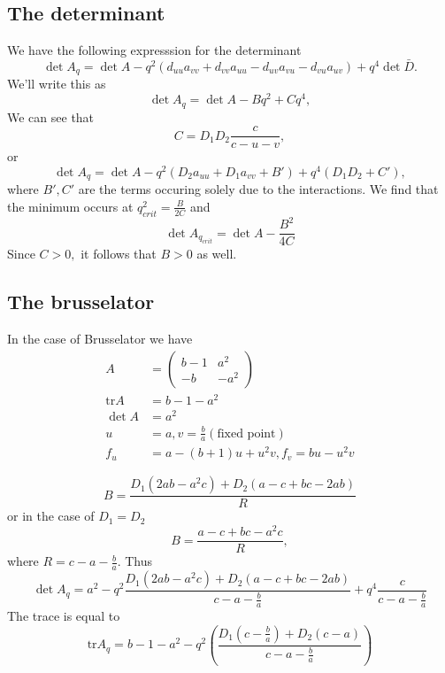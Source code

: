 \documentclass{article}
\newcommand{\tr}{\text{tr}}
\begin{document}
\subsection{The determinant}
We have the following expresssion for the determinant
\begin{equation}
\det A_q = \det A - q^2(d_{uu}a_{vv}+d_{vv}a_{uu}-d_{uv}a_{vu}-d_{vu}a_{uv})+q^4 \det \bar{D}.
\end{equation}
We'll write this as
\begin{equation}
\det A_q = \det A - Bq^2 + C q^4,
\end{equation}
We can see that
\begin{equation}
C = D_1D_2\frac{c}{c-u-v},
\end{equation}
or
\begin{equation}
\det A_q = \det A - q^2(D_{2}a_{uu}+D_1a_{vv} + B') + q^4 (D_1 D_2 + C'),
\end{equation}
where $B',C'$ are the terms occuring solely due to the interactions.
We find that the minimum occurs at $q_{crit}^2 = \frac {B}{2C}$ and
\begin{equation}
\det A_{q_{crit}} = \det A - \frac{B^2}{4C}
\end{equation}
Since $C>0,$ it follows that $B>0$ as well.

\subsection{The brusselator}
In the case of Brusselator we have
\begin{align}
A&=\begin{pmatrix}b-1& a^2 \\ -b &-a^2\end{pmatrix}\\
\tr A &= b-1-a^2\\
\det A&= a^2\\
u&=a,v=\frac{b}{a} (\text{fixed point})\\
f_u &= a-(b+1)u+u^2v, f_v = bu-u^2v
\end{align}

\begin{equation}
B=\frac{D_1(2ab-a^2c)+D_2(a-c+bc-2ab)}{R}
\end{equation} or in the case of $D_1 = D_2$
\begin{equation}
B = \frac{a-c+bc-a^2c}{R},
\end{equation}
where $R = c-a-\frac ba$.
Thus
\begin{equation}
\det A_q = a^2 - q^2\frac{D_1(2ab-a^2c)+D_2(a-c+bc-2ab)}{c-a-\frac{b}{a}}+q^4\frac{c}{c-a-\frac{b}{a}}
\end{equation}
The trace is equal to
\begin{equation}
\tr A_q = b-1-a^2 - q^2 (\frac{D_1(c-\frac{b}{a})+D_2(c-a)}{c-a-\frac{b}{a}})
\end{equation}
\end{document}
